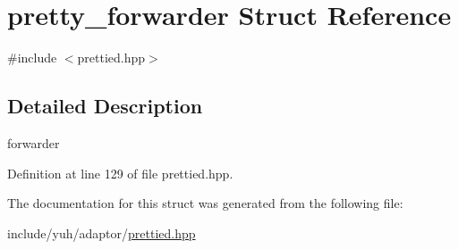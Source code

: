 \hypertarget{structyuh_1_1range__detail_1_1pretty__forwarder}{\section{pretty\-\_\-forwarder \-Struct \-Reference}
\label{db/d79/structyuh_1_1range__detail_1_1pretty__forwarder}
}


{\ttfamily \#include $<$prettied.\-hpp$>$}



\subsection{\-Detailed \-Description}
forwarder 

\-Definition at line 129 of file prettied.\-hpp.



\-The documentation for this struct was generated from the following file\-:\begin{DoxyCompactItemize}
\item 
include/yuh/adaptor/\hyperlink{prettied_8hpp}{prettied.\-hpp}\end{DoxyCompactItemize}
